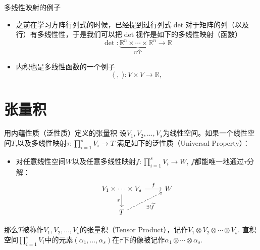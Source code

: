 
\begin{frame}

\begin{block}{多线性映射的例子}
\begin{itemize}
\item<1-> 之前在学习方阵行列式的时候，已经提到过行列式$\det$对于矩阵的列（以及行）有多线性性，于是我们可以把$\det$视作是如下的多线性映射（函数）
$$\det: \underbrace{\mathbb{R}^n \times \cdots \times \mathbb{R}^n}_{\text{$n$个}} \rightarrow \mathbb{R}$$
\item<2-> 内积也是多线性函数的一个例子
$$\langle \;,\; \rangle: V\times V \rightarrow \mathbb{R},$$
\end{itemize}
\end{block}

\end{frame}


\section{张量积}


\begin{frame}[fragile]

\begin{block}{用内蕴性质（泛性质）定义的张量积}
设$V_1,V_2,\ldots,V_s$为线性空间。如果一个线性空间$T$,以及多线性映射$\tau: \prod\limits_{i=1}^s V_i \to T$ 满足如下的泛性质（Universal Property）：
\begin{itemize}
\item 对任意线性空间$W$以及任意多线性映射$f: \prod\limits_{i=1}^s V_i \to W$, $f$都能唯一地通过$\tau$分解：
\[
\begin{tikzcd}
V_1 \times \cdots \times V_s \ar[r, "f"] \ar[d, "\tau"'] & W \\
T \ar[ur, dashrightarrow, "\exists! \widetilde{f}"'] &
\end{tikzcd}
\]
\end{itemize}
那么$T$被称作$V_1,V_2,\ldots,V_s$的张量积（Tensor Product），记作$V_1\otimes V_2\otimes \cdots \otimes V_s$. 直积空间$\prod\limits_{i=1}^s V_i$中的元素$(\alpha_1,\ldots,\alpha_s)$在$\tau$下的像被记作$\alpha_1\otimes\cdots\otimes\alpha_s.$
\end{block}

\end{frame}

